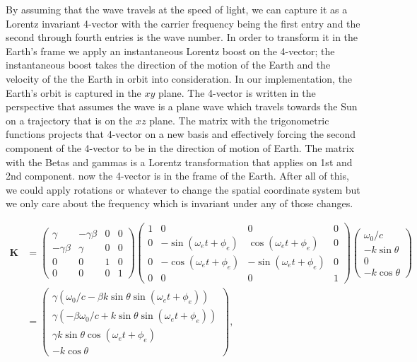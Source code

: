 \documentclass[onecolumn, groupedaddress, 10pt]{revtex4-1}
\begin{document}
By assuming that the wave travels at the speed of light, we can capture it as a Lorentz invariant 4-vector with the carrier frequency being the first entry and the second through fourth entries is the wave number. In order to transform it in the Earth's frame we apply an instantaneous Lorentz boost on the 4-vector; the instantaneous boost takes the direction of the motion of the Earth and the velocity of the the Earth in orbit into consideration. In our implementation, the Earth's orbit is captured in the $xy$ plane. The 4-vector is written in the perspective that assumes the wave is a plane wave which travels towards the Sun on a trajectory that is on the $xz$ plane. The matrix with the trigonometric functions projects that 4-vector on a new basis and effectively forcing the second component of the 4-vector to be in the direction of motion of Earth. The matrix with the Betas and gammas is a Lorentz transformation that applies on 1st and 2nd component. now the 4-vector is in the frame of the Earth. After all of this, we could apply rotations or whatever to change the spatial coordinate system but we only care about the frequency which is invariant under any of those changes.

\begin{align}
\label{eqn: new k}
\mathbf{K} &=
\left( \begin{array}{cccc}
	    \gamma   & -\gamma \beta & 0 & 0 \\
	-\gamma \beta &    \gamma    & 0 & 0 \\
	      0      &       0      & 1 & 0 \\
	      0      &       0      & 0 & 1
\end{array} \right)
\left( \begin{array}{cccc}
	1 &               0             &              0               & 0 \\
	0 & -\sin (\omega_e t + \phi_e) &  \cos (\omega_e t + \phi_e)  & 0 \\
	0 & -\cos (\omega_e t + \phi_e) &  -\sin (\omega_e t + \phi_e) & 0 \\
	0 &               0             &              0               & 1
\end{array} \right)							 
\left( \begin{array}{c}	
	   \omega_0 / c   \\
	- k \sin \theta \\
	        0       \\
	- k \cos \theta    
\end{array} \right)																			\\
&=
\left( \begin{array}{c}
	\gamma \left(\omega_0 / c - \beta k \sin \theta \sin (\omega_e t + \phi_e)\right) \\
	\gamma \left(-\beta \omega_0 / c + k \sin \theta \sin (\omega_e t + \phi_e)\right) \\
	           \gamma k \sin \theta \cos (\omega_e t + \phi_e)           \\
	                           - k \cos \theta
\end{array} \right)   ,
\end{align}
\end{document}
